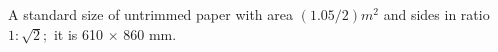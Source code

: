 A standard size of untrimmed paper with area $(1.05/2)m^{2}$  and sides in ratio
$ 1 : \sqrt{2} ; $ it is 610 \ensuremath{ \times } 860 mm.